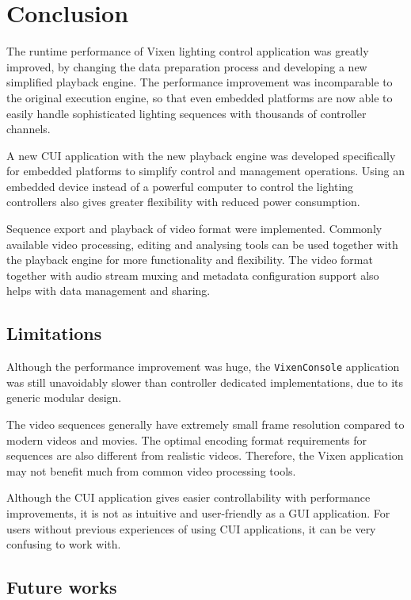 \chapter{Conclusion}
\renewcommand{\baselinestretch}{\mystretch}
\label{chap:Conclusion}

The runtime performance of Vixen lighting control application was greatly improved, by changing the data preparation process and developing a new simplified playback engine. The performance improvement was incomparable to the original execution engine, so that even embedded platforms are now able to easily handle sophisticated lighting sequences with thousands of controller channels.

A new CUI application with the new playback engine was developed specifically for embedded platforms to simplify control and management operations. Using an embedded device instead of a powerful computer to control the lighting controllers also gives greater flexibility with reduced power consumption.

Sequence export and playback of video format were implemented. Commonly available video processing, editing and analysing tools can be used together with the playback engine for more functionality and flexibility. The video format together with audio stream muxing and metadata configuration support also helps with data management and sharing.

\section{Limitations}

Although the performance improvement was huge, the \texttt{VixenConsole} application was still unavoidably slower than controller dedicated implementations, due to its generic modular design.

The video sequences generally have extremely small frame resolution compared to modern videos and movies. The optimal encoding format requirements for sequences are also different from realistic videos. Therefore, the Vixen application may not benefit much from common video processing tools.

Although the CUI application gives easier controllability with performance improvements, it is not as intuitive and user-friendly as a GUI application. For users without previous experiences of using CUI applications, it can be very confusing to work with.

\section{Future works}

